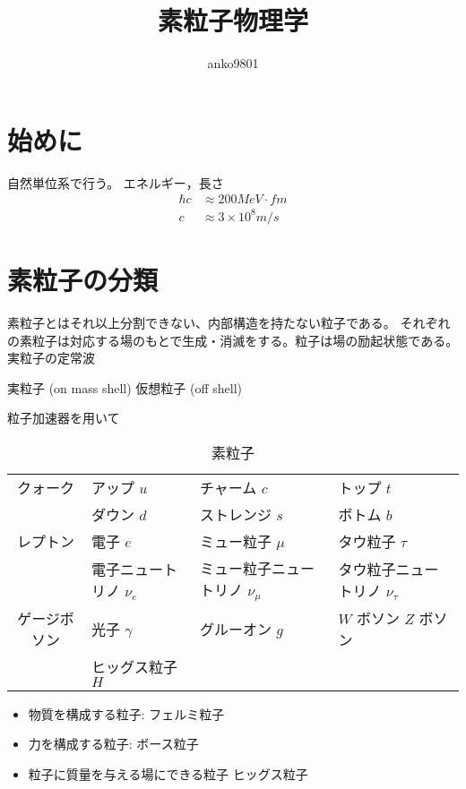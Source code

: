 \documentclass[a4paper,11pt]{jlreq}
\title{素粒子物理学}
\author{anko9801}
\begin{document}
\maketitle
\tableofcontents
\clearpage

\section{始めに}

自然単位系で行う。
エネルギー，長さ
\begin{align}
  \hbar c & \approx 200 \si{MeV\cdot fm}  \\
  c       & \approx 3\times 10^8 \si{m/s}
\end{align}

\section{素粒子の分類}

素粒子とはそれ以上分割できない、内部構造を持たない粒子である。
それぞれの素粒子は対応する場のもとで生成・消滅をする。粒子は場の励起状態である。
実粒子の定常波

実粒子 (on mass shell)
仮想粒子 (off shell)

粒子加速器を用いて

\begin{table}[h]
  \centering
  \begin{tabular}{|c|lll|}
    \hline
    クォーク   & アップ $u$          & チャーム $c$              & トップ $t$               \\
           & ダウン $d$          & ストレンジ $s$             & ボトム $b$               \\
    \hline
    レプトン   & 電子 $e$           & ミュー粒子 $\mu$           & タウ粒子 $\tau$           \\
           & 電子ニュートリノ $\nu_e$ & ミュー粒子ニュートリノ $\nu_\mu$ & タウ粒子ニュートリノ $\nu_\tau$ \\
    \hline
    ゲージボソン & 光子 $\gamma$      & グルーオン $g$             & $W$ ボソン $Z$ ボソン       \\
           & ヒッグス粒子 $H$       &                       &                       \\
    \hline
  \end{tabular}
  \caption{素粒子}
  \label{table:particles}
\end{table}
\begin{itemize}
  \item 物質を構成する粒子: フェルミ粒子
  \item 力を構成する粒子: ボース粒子
  \item 粒子に質量を与える場にできる粒子 ヒッグス粒子
\end{itemize}
\end{document}
